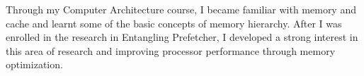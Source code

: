 \documentclass[11pt,a4paper]{article}
\begin{document}
Through my Computer Architecture course, I became familiar with memory and cache and learnt 
some of the basic concepts of memory hierarchy. After I was enrolled in the research in 
Entangling Prefetcher, I developed a strong interest in this area of research and improving 
processor performance through memory optimization.



\end{document}
